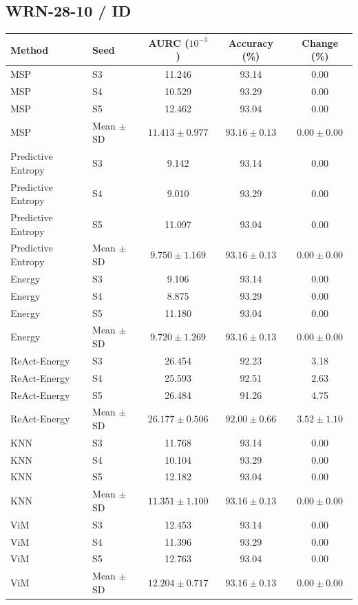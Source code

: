 \subsection*{WRN-28-10 / ID}
\begingroup
\footnotesize
\setlength{\tabcolsep}{3pt}
\renewcommand{\arraystretch}{1.1}
\begin{longtable}{@{}llccc@{}}
\toprule
Method & Seed & AURC ($10^{-3}$) & Accuracy (\%) & Change (\%) \\
\midrule
\endhead
\bottomrule
\endlastfoot
MSP & S3 & 11.246 & 93.14 & 0.00 \\
MSP & S4 & 10.529 & 93.29 & 0.00 \\
MSP & S5 & 12.462 & 93.04 & 0.00 \\
MSP & Mean $\pm$ SD & $11.413 \pm 0.977$ & $93.16 \pm 0.13$ & $0.00 \pm 0.00$ \\
Predictive Entropy & S3 & 9.142 & 93.14 & 0.00 \\
Predictive Entropy & S4 & 9.010 & 93.29 & 0.00 \\
Predictive Entropy & S5 & 11.097 & 93.04 & 0.00 \\
Predictive Entropy & Mean $\pm$ SD & $9.750 \pm 1.169$ & $93.16 \pm 0.13$ & $0.00 \pm 0.00$ \\
Energy & S3 & 9.106 & 93.14 & 0.00 \\
Energy & S4 & 8.875 & 93.29 & 0.00 \\
Energy & S5 & 11.180 & 93.04 & 0.00 \\
Energy & Mean $\pm$ SD & $9.720 \pm 1.269$ & $93.16 \pm 0.13$ & $0.00 \pm 0.00$ \\
ReAct-Energy & S3 & 26.454 & 92.23 & 3.18 \\
ReAct-Energy & S4 & 25.593 & 92.51 & 2.63 \\
ReAct-Energy & S5 & 26.484 & 91.26 & 4.75 \\
ReAct-Energy & Mean $\pm$ SD & $26.177 \pm 0.506$ & $92.00 \pm 0.66$ & $3.52 \pm 1.10$ \\
KNN & S3 & 11.768 & 93.14 & 0.00 \\
KNN & S4 & 10.104 & 93.29 & 0.00 \\
KNN & S5 & 12.182 & 93.04 & 0.00 \\
KNN & Mean $\pm$ SD & $11.351 \pm 1.100$ & $93.16 \pm 0.13$ & $0.00 \pm 0.00$ \\
ViM & S3 & 12.453 & 93.14 & 0.00 \\
ViM & S4 & 11.396 & 93.29 & 0.00 \\
ViM & S5 & 12.763 & 93.04 & 0.00 \\
ViM & Mean $\pm$ SD & $12.204 \pm 0.717$ & $93.16 \pm 0.13$ & $0.00 \pm 0.00$ \\

\end{longtable}
